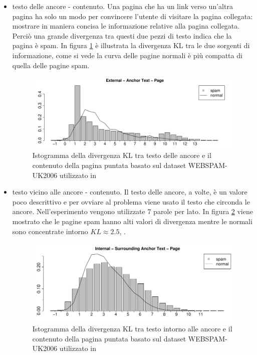 \begin{itemize}
\item testo delle ancore - contenuto. Una pagina che ha un link verso un'altra pagina ha solo un modo per convincere l'utente di visitare la pagina collegata: mostrare in maniera concisa le informazione relative alla pagina collegata. Perciò una grande divergenza tra questi due pezzi di testo indica che la pagina è spam. In figura \ref{fig:martinez1} è illustrata la divergenza KL tra le due sorgenti di informazione, come si vede la curva delle pagine normali è più compatta di quella delle pagine spam.
\begin{figure}[htbp]
\centering
\includegraphics[width=12cm]{immagini/martinez/martinez1}
\caption{Istogramma della divergenza KL tra testo delle ancore e il contenuto della pagina puntata basato sul dataset WEBSPAM-UK2006 utilizzato in \cite{Martinez-Romo:2009:WSI:1531914.1531920}}
\label{fig:martinez1}
\end{figure}

\item testo vicino alle ancore - contenuto. Il testo delle ancore, a volte, è un valore poco descrittivo e per ovviare al problema viene usato il testo che circonda le ancore. Nell'esperimento vengono utilizzate 7 parole per lato. In figura \ref{fig:martinez2} viene mostrato che le pagine spam hanno alti valori di divergenza mentre le normali sono concentrate intorno \(KL \approx  2.5\), .
\begin{figure}[htbp]
\centering
\includegraphics[width=12cm]{immagini/martinez/martinez2}
\caption{Istogramma della divergenza KL tra testo intorno alle ancore e il contenuto della pagina puntata basato sul dataset WEBSPAM-UK2006 utilizzato in \cite{Martinez-Romo:2009:WSI:1531914.1531920}}
\label{fig:martinez2}
\end{figure}


\end{itemize}

